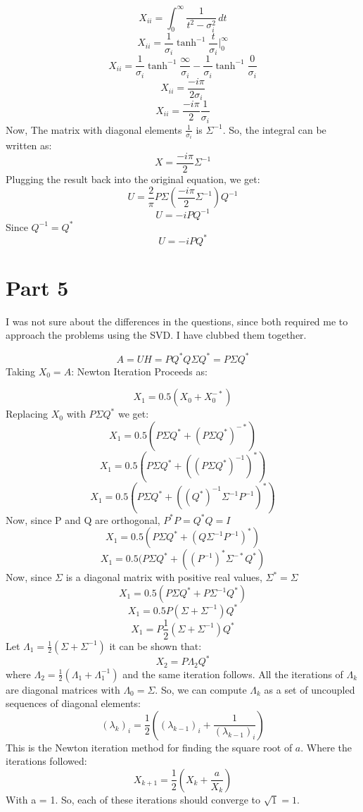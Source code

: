 \documentclass{article}
\begin{document}
\[X_{ii} =  \int_{0}^{\infty} \frac{1}{t^2 - \sigma_{i}^2} \,dt\]
\[X_{ii} =  \frac{1}{\sigma_{i}}\tanh^{-1}{\frac{t}{\sigma_{i}}}\bigg\rvert_{0}^{\infty}\]
\[X_{ii} =  \frac{1}{\sigma_{i}}\tanh^{-1}{\frac{\infty}{\sigma_{i}}} - \frac{1}{\sigma_{i}}\tanh^{-1}{\frac{0}{\sigma_{i}}} \]
\[X_{ii} =  \frac{-i \pi}{2 \sigma_{i}}\]
\[X_{ii} =  \frac{-i \pi}{2} \frac{1}{\sigma_{i}} \]
Now, The matrix with diagonal elements $\frac{1}{\sigma_{i}}$ is $\Sigma^{-1}$. So, the integral can be written as:
\[ X = \frac{-i\pi}{2} \Sigma^{-1}\]
Plugging the result back into the original equation, we get:
\[ U = \frac{2}{\pi} P \Sigma (\frac{-i\pi}{2} \Sigma^{-1}) Q^{-1}\]
\[U = -i PQ^{-1}\]
Since $Q^{-1} = Q^*$
\[U = -iPQ^*\]

\newpage
\section{Part 5}
I was not sure about the differences in the questions, since both required me to approach the problems using the SVD. I have clubbed them together.

\[A = U H = P Q^* Q \Sigma Q^* = P\Sigma Q^*\]
Taking $X_0 = A$:
Newton Iteration Proceeds as:

\[X_{1} = 0.5 (X_{0} + X_{0}^{-*})\]
Replacing $X_{0}$ with $P\Sigma Q^*$ we get:
\[X_{1} = 0.5 ( P\Sigma Q^* + (P\Sigma Q^*)^{-*} )\]
\[X_{1} = 0.5 ( P\Sigma Q^* + ((P\Sigma Q^*)^{-1})^{*} )\]
\[X_{1} = 0.5 ( P\Sigma Q^* + ((Q^*)^{-1} \Sigma^{-1} P^{-1})^{*} )\]
Now, since P and Q are orthogonal, $P^* P = Q^* Q = I$
\[X_{1} = 0.5 ( P\Sigma Q^* + (Q \Sigma^{-1} P^{-1})^{*} )\]
\[X_{1} = 0.5 ( P\Sigma Q^* + ((P^{-1})^{*}  \Sigma^{-*} Q^*)\]
Now, since $\Sigma$ is a diagonal matrix with positive real values, $\Sigma^{*} = \Sigma$
\[X_{1} = 0.5 ( P\Sigma Q^* + P \Sigma^{-1} Q^*)\]
\[X_{1} = 0.5 P (\Sigma + \Sigma^{-1}) Q^*\]
\[X_{1} = P \frac{1}{2} (\Sigma + \Sigma^{-1}) Q^*\]
Let $\Lambda_{1} = \frac{1}{2} (\Sigma + \Sigma^{-1})$
it can be shown that:
\[X_{2} = P \Lambda_{2} Q^*\]
where $\Lambda_{2} = \frac{1}{2} (\Lambda_{1} + \Lambda_{1}^{-1})$
and the same iteration follows. All the iterations of $\Lambda_{k}$ are diagonal matrices with $\Lambda_0 = \Sigma$.
So, we can compute $\Lambda_{k}$ as a set of uncoupled sequences of diagonal elements: 
\[(\lambda_{k})_i = \frac{1}{2}((\lambda_{k-1})_i + \frac{1}{(\lambda_{k-1})_i})\]
This is the Newton iteration method for finding the square root of $a$. Where the iterations followed:
\[ X_{k+1} = \frac{1}{2} (X_{k} + \frac{a}{X_{k}}) \]
With a = 1. So, each of these iterations should converge to $\sqrt{1} = 1$.
\end{document}
